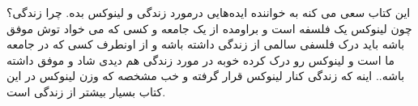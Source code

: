 این کتاب سعی می کنه به خواننده ایده‌هایی درمورد زندگی و لینوکس بده. چرا زندگی؟ چون لینوکس یک فلسفه است و براومده از یک جامعه و کسی که می خواد توش موفق باشه باید درک فلسفی سالمی از زندگی داشته باشه و از اونطرف کسی که در جامعه ما است و لینوکس رو درک کرده خوبه در مورد زندگی هم دیدی شاد و موفق داشته باشه.. اینه که زندگی کنار لینوکس قرار گرفته و خب مشخصه که وزن لینوکس در این کتاب بسیار بیشتر از زندگی است.
